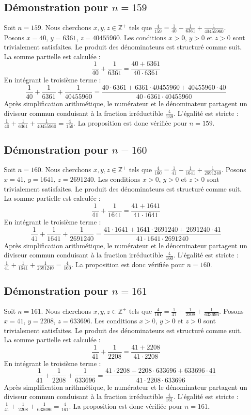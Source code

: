 \documentclass[11pt,a4paper]{article}
\begin{document}
\subsection{Démonstration pour $n = 159$}
Soit $n = 159$. Nous cherchons $x, y, z \in \mathbb{Z}^{+}$ tels que $\frac{4}{159} = \frac{1}{40} + \frac{1}{6361} + \frac{1}{40455960}$.
Posons $x = 40$, $y = 6361$, $z = 40455960$.
Les conditions $x > 0$, $y > 0$ et $z > 0$ sont trivialement satisfaites.
Le produit des dénominateurs est structuré comme suit. La somme partielle est calculée :
$$ \frac{1}{40} + \frac{1}{6361} = \frac{40+6361}{40 \cdot 6361} $$
En intégrant le troisième terme :
$$ \frac{1}{40} + \frac{1}{6361} + \frac{1}{40455960} = \frac{40 \cdot 6361 + 6361 \cdot 40455960 + 40455960 \cdot 40}{40 \cdot 6361 \cdot 40455960} $$
Après simplification arithmétique, le numérateur et le dénominateur partagent un diviseur commun conduisant à la fraction irréductible $\frac{4}{159}$.
L'égalité est stricte : $\frac{1}{40} + \frac{1}{6361} + \frac{1}{40455960} = \frac{4}{159}$.
La proposition est donc vérifiée pour $n = 159$.
\subsection{Démonstration pour $n = 160$}
Soit $n = 160$. Nous cherchons $x, y, z \in \mathbb{Z}^{+}$ tels que $\frac{4}{160} = \frac{1}{41} + \frac{1}{1641} + \frac{1}{2691240}$.
Posons $x = 41$, $y = 1641$, $z = 2691240$.
Les conditions $x > 0$, $y > 0$ et $z > 0$ sont trivialement satisfaites.
Le produit des dénominateurs est structuré comme suit. La somme partielle est calculée :
$$ \frac{1}{41} + \frac{1}{1641} = \frac{41+1641}{41 \cdot 1641} $$
En intégrant le troisième terme :
$$ \frac{1}{41} + \frac{1}{1641} + \frac{1}{2691240} = \frac{41 \cdot 1641 + 1641 \cdot 2691240 + 2691240 \cdot 41}{41 \cdot 1641 \cdot 2691240} $$
Après simplification arithmétique, le numérateur et le dénominateur partagent un diviseur commun conduisant à la fraction irréductible $\frac{4}{160}$.
L'égalité est stricte : $\frac{1}{41} + \frac{1}{1641} + \frac{1}{2691240} = \frac{4}{160}$.
La proposition est donc vérifiée pour $n = 160$.
\subsection{Démonstration pour $n = 161$}
Soit $n = 161$. Nous cherchons $x, y, z \in \mathbb{Z}^{+}$ tels que $\frac{4}{161} = \frac{1}{41} + \frac{1}{2208} + \frac{1}{633696}$.
Posons $x = 41$, $y = 2208$, $z = 633696$.
Les conditions $x > 0$, $y > 0$ et $z > 0$ sont trivialement satisfaites.
Le produit des dénominateurs est structuré comme suit. La somme partielle est calculée :
$$ \frac{1}{41} + \frac{1}{2208} = \frac{41+2208}{41 \cdot 2208} $$
En intégrant le troisième terme :
$$ \frac{1}{41} + \frac{1}{2208} + \frac{1}{633696} = \frac{41 \cdot 2208 + 2208 \cdot 633696 + 633696 \cdot 41}{41 \cdot 2208 \cdot 633696} $$
Après simplification arithmétique, le numérateur et le dénominateur partagent un diviseur commun conduisant à la fraction irréductible $\frac{4}{161}$.
L'égalité est stricte : $\frac{1}{41} + \frac{1}{2208} + \frac{1}{633696} = \frac{4}{161}$.
La proposition est donc vérifiée pour $n = 161$.
\end{document}
